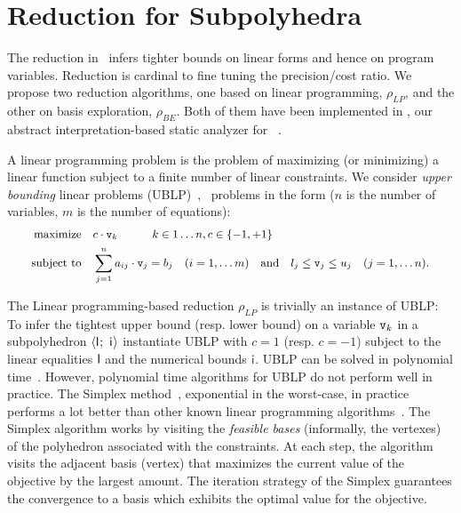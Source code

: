 \documentclass{llncs}
\begin{document}
\section{Reduction for Subpolyhedra}
\label{sect:reduction}
The reduction in \SubPolyhedra\  infers tighter bounds on linear forms and hence on program variables.
Reduction is cardinal to fine tuning the precision/cost ratio.
We propose two reduction algorithms, one based on linear programming, $\rho_\mathit{LP}$, and the other on basis exploration, $\rho_\mathit{BE}$.
Both of them have been implemented in \Clousot, our abstract interpretation-based static analyzer for \NET~\cite{FoxtrotClousot}.

A linear programming problem is the problem of maximizing (or minimizing) a linear function subject to a finite number of linear constraints.
We consider \emph{upper bounding} linear problems (UBLP)~\cite{LinearProgramming}, \ie\ problems in the form ($n$ is the number of variables, $m$ is the number of equations):
\[
\small
\begin{aligned}
\text{maximize}  &\quad c \cdot \var_k \quad \quad\quad  k \in {1 \dots n}, c \in \{ -1, +1 \} \\
\text{subject to} & \quad\sum_{j=1}^n a_{ij} \cdot \var_j = b_j \quad (i = 1, \dots m) 
 \quad \text{and} \quad l_j \leq \var_j \leq u_j \quad  (j = 1, \dots n). 
\end{aligned}
 \]

The Linear programming-based reduction $\rho_\mathit{LP}$ is trivially an instance of UBLP:
To infer the tightest upper bound (resp. lower bound) on a variable $\mathtt{v}_k$ in a subpolyhedron $\langle \mathsf{\mathsf{l}}_{}^{};\ \mathsf{\mathsf{i}}_{}^{} \rangle$ instantiate UBLP with $c = 1$ (resp. $c = -1$) subject to the linear equalities $\mathsf{\mathsf{l}}$ and the numerical bounds $\mathsf{\mathsf{i}}$.
UBLP can be solved in polynomial time~\cite{LinearProgramming}. 
However, polynomial time algorithms for UBLP do not perform well in practice.
The Simplex method~\cite{Dantzig48}, exponential in the worst-case, in practice performs a lot better than other known linear programming algorithms~\cite{SpielmanTeng04}.
The Simplex algorithm works by visiting the \emph{feasible bases} (informally, the vertexes) of the polyhedron associated with the constraints. 
At each step, the algorithm visits the adjacent basis (vertex) that maximizes the current value of the objective by the largest amount. 
The iteration strategy of the Simplex guarantees the convergence to a basis which exhibits the optimal value for the objective. 
\end{document}
